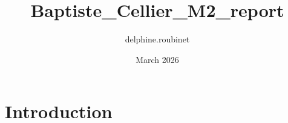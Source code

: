 \documentclass{article}
\title{Baptiste_Cellier_M2_report}
\author{delphine.roubinet }
\date{March 2026}
\begin{document}
\maketitle

\section{Introduction}
\end{document}
